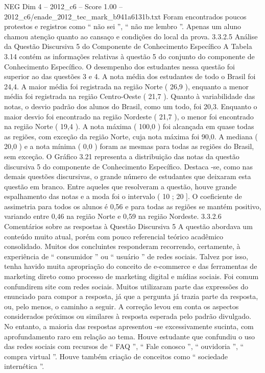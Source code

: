 \begin{textsample}{NEG Dim 4 – 2012\_c6 – Score 1.00 – 2012\_c6/enade\_2012\_tec\_mark\_b941a6131b.txt}
Foram encontrados poucos protestos e registros como “ não sei ”, “ não me lembro ”.
Apenas um aluno chamou atenção quanto ao cansaço e condições do local da prova. 3.3.2.5 Análise da Questão Discursiva 5 do Componente de Conhecimento Específico A Tabela 3.14 contém as informações relativas à questão 5 do conjunto do componente de Conhecimento Específico.
O desempenho dos estudantes nessa questão foi superior ao das questões 3 e 4.
A nota média dos estudantes de todo o Brasil foi 24,4.
A maior média foi registrada na região Norte ( 26,9 ), enquanto a menor média foi registrada na região Centro-Oeste ( 21,7 ).
Quanto à variabilidade das notas, o desvio padrão dos alunos do Brasil, como um todo, foi 20,3.
Enquanto o maior desvio foi encontrado na região Nordeste ( 21,7 ), o menor foi encontrado na região Norte ( 19,4 ).
A nota máxima ( 100,0 ) foi alcançada em quase todas as regiões, com exceção da região Norte, cuja nota máxima foi 90,0.
A mediana ( 20,0 ) e a nota mínima ( 0,0 ) foram as mesmas para todas as regiões do Brasil, sem exceção.
O Gráfico 3.21 representa a distribuição das notas da questão discursiva 5 do componente de Conhecimento Específico.
Destaca -se, como nas demais questões discursivas, o grande número de estudantes que deixaram esta questão em branco.
Entre aqueles que resolveram a questão, houve grande espalhamento das notas e a moda foi o intervalo ( 10 ; 20 ].
O coeficiente de assimetria para todos os alunos é 0,56 e para todas as regiões se mantém positivo, variando entre 0,46 na região Norte e 0,59 na região Nordeste. 3.3.2.6 Comentários sobre as respostas à Questão Discursiva 5 A questão abordava um conteúdo muito atual, porém com pouco referencial teórico acadêmico consolidado.
Muitos dos concluintes responderam recorrendo, certamente, à experiência de “ consumidor ” ou “ usuário ” de redes sociais.
Talvez por isso, tenha havido muita apropriação do conceito de e-commerce e das ferramentas de marketing direto como processo de marketing digital e mídias sociais.
Foi comum confundirem site com redes sociais.
Muitos utilizaram parte das expressões do enunciado para compor a resposta, já que a pergunta já trazia parte da resposta, ou, pelo menos, o caminho a seguir.
A correção levou em conta os aspectos considerados próximos ou similares à resposta esperada pelo padrão divulgado.
No entanto, a maioria das respostas apresentou -se excessivamente sucinta, com aprofundamento raro em relação ao tema.
Houve estudante que confundiu o uso das redes sociais com recursos de “ FAQ ”, “ Fale conosco ”, “ ouvidoria ”, “ compra virtual ”.
Houve também criação de conceitos como “ sociedade internética ”.

\end{textsample}
